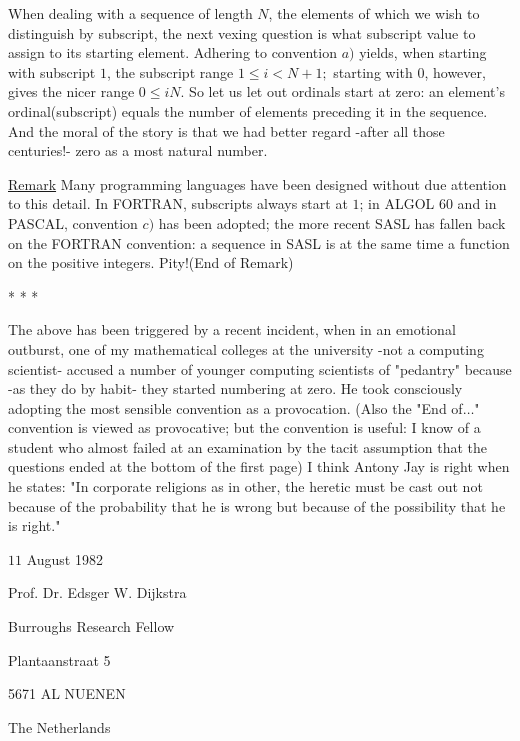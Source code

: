 \documentclass[a4paper,11pt]{article}
\begin{document}
When dealing with a sequence of length $N$, the elements of which we wish to distinguish by subscript, the next vexing question is what subscript value to assign to its starting element. Adhering to convention $a)$ yields, when starting with subscript $1$, the subscript range $1 \leq i < N+1;$ starting with $0$, however, gives the nicer range $0 \leq i  N$. So let us let out ordinals start at zero: an element’s ordinal(subscript) equals the number of elements preceding it in the sequence. And the moral of the story is that we had better regard -after all those centuries!- zero as a most natural number.

\underline{Remark} Many programming languages have been designed without due attention to this detail. In FORTRAN, subscripts always start at $1$; in ALGOL $60$ and in PASCAL, convention $c)$ has been adopted; the more recent SASL has fallen back on the FORTRAN convention: a sequence in SASL is at the same time a function on the positive integers. Pity!(End of Remark)
\begin{center}
*    *    *
\end{center}

The above has been triggered by a recent incident, when in an emotional outburst, one of my mathematical colleges at the university -not a computing scientist- accused a number of younger computing scientists of "pedantry" because -as they do by habit- they started numbering at zero. He took consciously adopting the most sensible convention as a provocation. (Also the "End of$\ldots$" convention is viewed as provocative; but the convention is useful: I know of a student who almost failed at an examination by the tacit assumption that the questions ended at the bottom of the first page) I think Antony Jay is right when he states: "In corporate religions as in other, the heretic must be cast out not because of the probability that he is wrong but because of the possibility that he is right."

\begin{flushright}
$11$ August 1982

Prof. Dr. Edsger W. Dijkstra

Burroughs Research Fellow

Plantaanstraat 5

5671 AL NUENEN

The Netherlands

\end{flushright}
\end{document}
